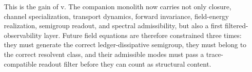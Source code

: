 This is the gain of v\docversion. The companion monolith now carries not only
closure, channel specialization, transport dynamics, forward invariance,
field-energy realization, semigroup readout, and spectral admissibility, but also a
first filtered-observability layer. Future field equations are therefore constrained
three times: they must generate the correct ledger-dissipative semigroup, they must
belong to the correct resolvent class, and their admissible modes must pass a
trace-compatible readout filter before they can count as structural content.


